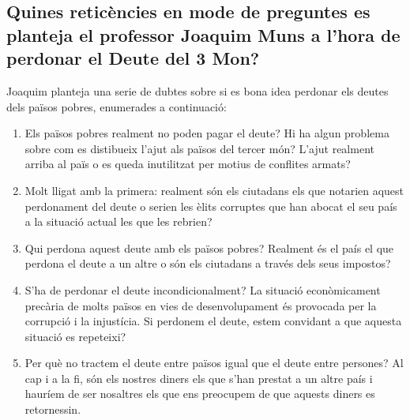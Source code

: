 \subsection{Quines reticències en mode de preguntes es planteja el professor
Joaquim Muns a l’hora de perdonar el Deute del 3 Mon?}

Joaquim planteja una serie de dubtes sobre si es bona idea perdonar els
deutes dels països pobres, enumerades a continuació:

\begin{enumerate}
  \item Els països pobres realment no poden pagar el deute? Hi ha algun
  problema sobre com es distibueix l'ajut als països del tercer món?
  L'ajut realment arriba al païs o es queda inutilitzat per motius de
  conflites armats?

  \item Molt lligat amb la primera: realment són els ciutadans els que 
  notarien aquest perdonament del deute o serien les èlits corruptes que
  han abocat el seu país a la situació actual les que les rebrien?

  \item Qui perdona aquest deute amb els països pobres? Realment és el
  país el que perdona el deute a un altre o són els ciutadans a través
  dels seus impostos?

  \item S'ha de perdonar el deute incondicionalment? La situació
  econòmicament precària de molts països en vies de desenvolupament
  és provocada per la corrupció i la injustícia. Si perdonem el deute,
  estem convidant a que aquesta situació es repeteixi?

  \item Per què no tractem el deute entre països igual que el deute entre
  persones? Al cap i a la fi, són els nostres diners els que s'han prestat
  a un altre país i hauríem de ser nosaltres els que ens preocupem de que 
  aquests diners es retornessin.
\end{enumerate}

